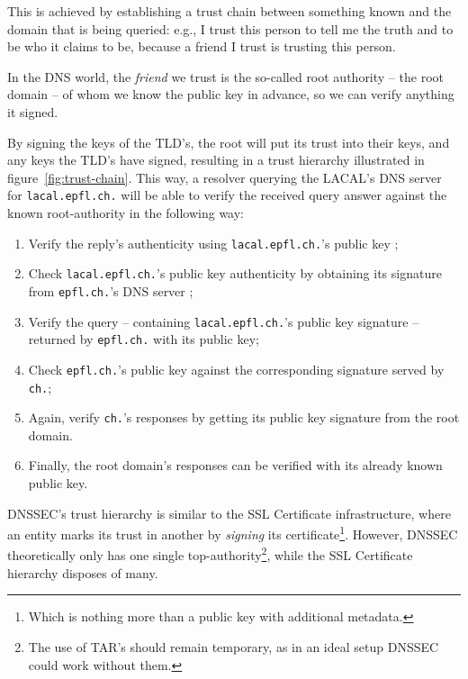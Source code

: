 \documentclass[a4paper,twocolumn]{scrartcl}
\begin{document}
This is achieved by establishing a trust chain between something known and the domain that is being queried: e.g., I trust this person to tell me the truth and to be who it claims to be, because a friend I trust is trusting this person.

In the DNS world, the \emph{friend} we trust is the so-called root authority -- the root domain -- of whom we know the public key in advance, so we can verify anything it signed.

By signing the keys of the TLD's, the root will put its trust into their keys, and any keys the TLD's have signed, resulting in a trust hierarchy illustrated in figure~\ref{fig:trust-chain}. This way, a resolver querying the LACAL's DNS server for \verb|lacal.epfl.ch.| will be able to verify the received query answer against the known root-authority in the following way:

\begin{enumerate}
\item Verify the reply's authenticity using \verb|lacal.epfl.ch.|'s public key ;
\item Check \verb|lacal.epfl.ch.|'s public key authenticity by obtaining its signature from \verb|epfl.ch.|'s DNS server ;
\item Verify the query -- containing \verb|lacal.epfl.ch.|'s public key signature -- returned by \verb|epfl.ch.| with its public key;
\item Check \verb|epfl.ch.|'s public key against the corresponding signature served by \verb|ch.|;
\item Again, verify \verb|ch.|'s responses by getting its public key signature from the root domain.
\item Finally, the root domain's responses can be verified with its already known public key.
\end{enumerate}

DNSSEC's trust hierarchy is similar to the SSL Certificate infrastructure, where an entity marks its trust in another by \emph{signing} its certificate\footnote{Which is nothing more than a public key with additional metadata.}. However, DNSSEC theoretically only has one single top-authority\footnote{The use of TAR's should remain temporary, as in an ideal setup DNSSEC could work without them.}, while the SSL Certificate hierarchy disposes of many.
\end{document}

